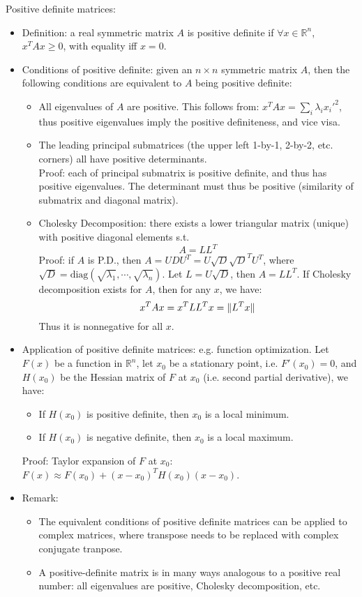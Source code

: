 \documentclass{report}
\begin{document}
Positive definite matrices: 
\begin{itemize}
\item Definition: a real symmetric matrix $A$ is positive definite if $\forall x \in \mathbb{R}^n$, $x^T A x \geq 0$, with equality iff $x = 0$. 

\item Conditions of positive definite: given an $n \times n$ symmetric matrix $A$, then the following conditions are equivalent to $A$ being positive definite:
\begin{itemize}
\item All eigenvalues of $A$ are positive. This follows from: $x^T A x = \sum_i \lambda_i x_i'^2$, thus positive eigenvalues imply the positive definiteness, and vice visa.  
\item The leading principal submatrices (the upper left 1-by-1, 2-by-2, etc. corners) all have positive determinants. \\
Proof: each of principal submatrix is positive definite, and thus has positive eigenvalues. The determinant must thus be positive (similarity of submatrix and diagonal matrix). 
\item Cholesky Decomposition: there exists a lower triangular matrix (unique) with positive diagonal elements s.t.
\begin{equation}
A = L L^T	
\end{equation}
Proof: if $A$ is P.D., then $A = UDU^T = U \sqrt{D} \sqrt{D}^T U^T$, where $\sqrt{D} = \text{diag}(\sqrt{\lambda_1}, \cdots, \sqrt{\lambda_n})$. Let $L = U \sqrt{D}$, then $A = L L^T$. If Cholesky decomposition exists for $A$, then for any $x$, we have: 
\begin{equation}
x^T A x = x^T L L^T x = \lVert L^T x\rVert	
\end{equation}
Thus it is nonnegative for all $x$. 
\end{itemize}

\item Application of positive definite matrices: e.g. function optimization. Let $F(x)$ be a function in $\mathbb{R}^n$, let $x_0$ be a stationary point, i.e. $F'(x_0) = 0$, and $H(x_0)$ be the Hessian matrix of $F$ at $x_0$ (i.e. second partial derivative), we have: 
\begin{itemize}
	\item If $H(x_0)$ is positive definite, then $x_0$ is a local minimum. 
	\item If $H(x_0)$ is negative definite, then $x_0$ is a local maximum.
\end{itemize}
Proof: Taylor expansion of $F$ at $x_0$: $F(x) \approx F(x_0) + (x-x_0)^T H(x_0) (x-x_0)$.  

\item Remark: 
\begin{itemize}
	\item The equivalent conditions of positive definite matrices can be applied to complex matrices, where transpose needs to be replaced with complex conjugate tranpose. 
	\item A positive-definite matrix is in many ways analogous to a positive real number: all eigenvalues are positive, Cholesky decomposition, etc. 
\end{itemize}
\end{itemize}
\end{document}
